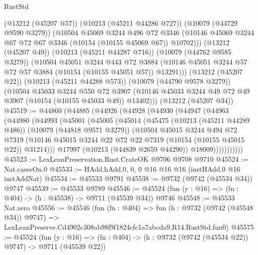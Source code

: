 \begin{lexlean}{RustStd}
\begin{coremodule}
          (@13212 (@45207 @57))
          (@10213 (@45211 @44286 @727))
          (@10079 (@44729 @9590 @3279))
          (@10504
            @45069
            @3244
            @496
            @72
            @3346
            (@10146 @45069 @3244 @67 @72 @67 @3346 (@10154 (@10155 @45069 @67)) @10702)))
        (@13212 (@45207 @49))
        (@10213 (@45211 @44287 @716))
        (@10079 (@44762 @9585 @3279))
        (@10504
          @45051
          @3244
          @443
          @72
          @3884
          (@10146 @45051 @3244 @57 @72 @57 @3884 (@10154 (@10155 @45051 @57)) @13291)))
      (@13212 (@45207 @22))
      (@10213 (@45211 @44288 @573))
      (@10079 (@44790 @9578 @3279))
      (@10504
        @45033
        @3244
        @550
        @72
        @3907
        (@10146 @45033 @3244 @49 @72 @49 @3907 (@10154 (@10155 @45033 @49)) @13402)))
    (@13212 (@45207 @34))
@45519 := @44860
    (@44885
      (@44926
        (@44928
          (@44930
            (@44947
              (@44963
                (@44980
                  (@44993
                    (@45001
                      (@45005
                        (@45014
                          (@45475
                            (@10213 (@45211 @44289 @486))
                            (@10079 (@44818 @9571 @3279))
                            (@10504
                              @45015
                              @3244
                              @494
                              @72
                              @7319
                              (@10146
                                @45015
                                @3244
                                @22
                                @72
                                @22
                                @7319
                                (@10154 (@10155 @45015 @22))
                                @31214)))
                          @17997
                          (@10213 (@44839 @2659 @44290))
                          @18009)))))))))))
@45523 := LexLeanPreservation.Rust.CrateOK @9706 @9708 @9710
@45524 := Nat.casesOn.{0}
@45533 := HAdd.hAdd.{0, 0, 0} @16 @16 @16 (instHAdd.{0} @16 instAddNat)
@45534 := @45533 @9791
@45538 := @9732 (@9742 (@45534 @34)) @9747
@45539 := @45533 @9789
@45546 := @45524 (fun (y : @16) => (fn : @404) -> (h : @45538) -> @9711 (@45539 @34)) @9746
@45548 := @45533 Nat.zero
@45556 := @45546
    (fun (fn : @404) =>
    fun (h : @9732 (@9742 (@45548 @34)) @9747) =>
    LexLeanPreserve.Cd4902c308ab98f9f1824cfc1a7abcda9.R14.RustStd.fun0)
@45575 := @45524
    (fun (y : @16) => (fn : @404) -> (h : @9732 (@9742 (@45534 @22)) @9747) -> @9711 (@45539 @22))

\end{coremodule}
\end{lexlean}
